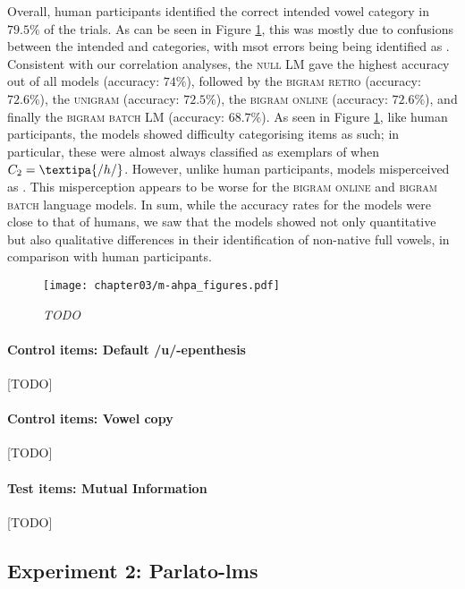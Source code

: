 {Overall, human participants identified the correct intended vowel category in $79.5\%$ of the trials. As can be seen in Figure \ref{fig:m-ahpa_fV_acc}, this was mostly due to confusions between the intended  and  categories, with msot errors being  being identified as .
Consistent with our correlation analyses, the \textsc{null} LM gave the highest accuracy out of all models (accuracy: $74\%$), followed by the \textsc{bigram retro} (accuracy: $72.6\%$), the \textsc{unigram} (accuracy: $72.5\%$), the \textsc{bigram online} (accuracy: $72.6\%$), and finally the \textsc{bigram batch} LM (accuracy: $68.7\%$). 
As seen in Figure \ref{fig:m-ahpa_fV_acc}, like human participants, the models showed difficulty categorising  items as such; in particular, these were almost always classified as exemplars of  when $C_2 = \textipa{/h/}$. However, unlike human participants, models misperceived  as . This misperception appears to be worse for the \textsc{bigram online} and \textsc{bigram batch} language models.
In sum, while the accuracy rates for the models were close to that of humans, we saw that the models showed not only quantitative but also qualitative differences in their identification of non-native full vowels, in comparison with human participants. 

\begin{figure}[htb]
\centering
\texttt{[image: chapter03/m-ahpa\_figures.pdf]}
\caption{\textit{{\color{red}TODO}}}
\label{fig:m-ahpa_fV_acc}
\end{figure}

\paragraph{Control items: Default /u/-epenthesis}
{\color{red}[TODO]}

\paragraph{Control items: Vowel copy}
{\color{red}[TODO]}

\paragraph{Test items: Mutual Information}
{\color{red}[TODO]}

\subsection{Experiment 2: {\color{red}Parlato-lms}}
}
